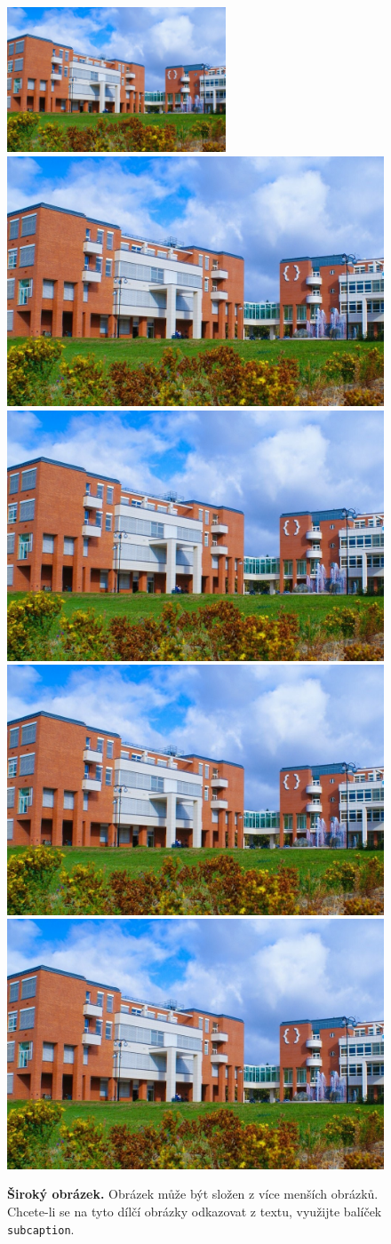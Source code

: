 \begin{figure}[h]\centering
  \centering
  \includegraphics[width=\linewidth,height=1.7in]{obrazky/uhk.jpg}\\[1pt]
  \includegraphics[width=0.24\linewidth]{obrazky/uhk.jpg}\hfill
  \includegraphics[width=0.24\linewidth]{obrazky/uhk.jpg}\hfill
  \includegraphics[width=0.24\linewidth]{obrazky/uhk.jpg}\hfill
  \includegraphics[width=0.24\linewidth]{obrazky/uhk.jpg}
  \caption{\textbf{Široký obrázek.} Obrázek může být složen z více menších obrázků. Chcete-li se na tyto dílčí obrázky odkazovat z textu, využijte balíček \texttt{subcaption}.}
  \label{sirokyObrazek}
\end{figure}


